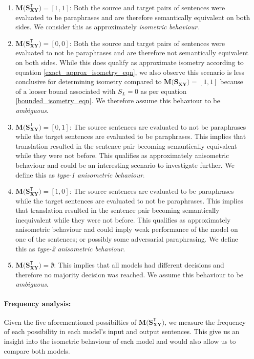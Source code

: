 \documentclass[11pt,a4paper]{article}
\begin{document}
\begin{enumerate}
\item $\mathbf{M(S_{XY}^{\mathsf{T}}}) = [1, 1]$: Both the source and target pairs of sentences were evaluated to be paraphrases and are therefore semantically equivalent on both sides. We consider this as approximately \textit{isometric behaviour}.
\item $\mathbf{M(S_{XY}^{\mathsf{T}}}) = [0, 0]$: Both the source and target pairs of sentences were evaluated to not be paraphrases and are therefore not semantically equivalent on both sides. While this does qualify as approximate isometry according to equation \ref{exact_approx_isometry_eqn}, we also observe this scenario is less conclusive for determining isometry compared to $\mathbf{M(S_{XY}^{\mathsf{T}}}) = [1, 1]$ because of a looser bound associated with $S_L=0$ as per equation \ref{bounded_isometry_eqn}. We therefore assume this behaviour to be \textit{ambiguous}.  
\item $\mathbf{M(S_{XY}^{\mathsf{T}}}) = [0, 1]$: The source sentences are evaluated to not be paraphrases while the target sentences are evaluated to be paraphrases. This implies that translation resulted in the sentence pair becoming semantically equivalent while they were not before. This qualifies as approximately anisometric behaviour and could be an interesting scenario to investigate further. We define this as \textit{type-1 anisometric behaviour}.
\item $\mathbf{M(S_{XY}^{\mathsf{T}}}) = [1, 0]$: The source sentences are evaluated to be paraphrases while the target sentences are evaluated to not be paraphrases. This implies that translation resulted in the sentence pair becoming semantically inequivalent while they were not before. This qualifies as approximately anisometric behaviour and could imply weak performance of the model on one of the sentences; or possibly some adversarial paraphrasing. We define this as \textit{type-2 anisometric behaviour}.
\item $\mathbf{M(S_{XY}^{\mathsf{T}}}) = \emptyset$: This implies that all models had different decisions and therefore no majority decision was reached. We assume this behaviour to be \textit{ambiguous}. 
\end{enumerate}

\paragraph{Frequency analysis:} Given the five aforementioned possibilties of $\mathbf{M(S_{XY}^{\mathsf{T}}})$, we measure the frequency of each possibility in each model's input and output sentences. This give us an insight into the isometric behaviour of each model and would also allow us to compare both models.
\end{document}
